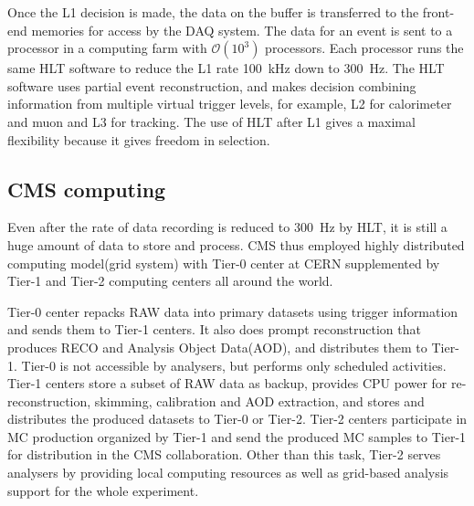 Once the L1 decision is made, %
the data on the buffer is transferred to the front-end memories for access 
by the DAQ system. The data for an event is sent to a processor 
in a computing farm with $\mathcal{O}(10^3)$ processors. 
Each processor runs the same HLT software to reduce the L1 rate 100~kHz 
down to 300~Hz. The HLT software uses partial event reconstruction, 
and makes decision combining information from multiple virtual trigger 
levels, for example, L2 for calorimeter and muon and L3 for tracking. 
The use of HLT after L1 gives a maximal flexibility because 
it gives freedom in selection. 



\subsection{CMS computing}  

Even after the rate of data recording is reduced to 300~Hz by HLT, 
it is still a huge amount of data to store and process. CMS thus employed 
highly distributed computing model(grid system) with Tier-0 center at CERN supplemented 
by Tier-1 and Tier-2 computing centers all around the world. 

Tier-0 center repacks RAW data into primary datasets using trigger information
and sends them to Tier-1 centers. It also does prompt reconstruction 
that produces RECO and Analysis Object Data(AOD),
and distributes them to Tier-1. Tier-0 is not accessible by analysers, but  
performs only scheduled activities. 
Tier-1 centers store a subset of RAW data as backup, provides CPU power for 
re-reconstruction, skimming, calibration and AOD extraction, and 
stores and distributes the produced datasets to Tier-0 or Tier-2. 
Tier-2 centers participate in MC production organized by Tier-1 and 
send the produced MC samples to Tier-1 for distribution in the CMS collaboration. 
Other than this task, Tier-2 serves analysers by providing local computing 
resources as well as grid-based analysis support for the whole experiment.  
